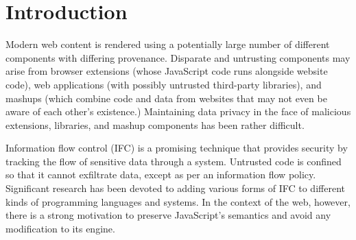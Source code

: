 \section{Introduction}
\label{sec:intro}

Modern web content is rendered using a potentially large number of
different components with differing provenance.
Disparate and untrusting components may arise from browser
extensions (whose JavaScript code runs alongside website
code), web applications (with possibly untrusted third-party
libraries), and mashups (which combine code and data from
websites that may not even be aware of each other's existence.)
Maintaining data privacy in the face of malicious
extensions, libraries, and mashup components has been rather difficult.

Information flow control (IFC) is a promising technique that provides security
by tracking the flow of sensitive data through a system.  Untrusted code is
confined so that it cannot exfiltrate data, except as per an information flow
policy.  Significant research has been devoted to adding various forms of IFC to
different kinds of programming languages and systems.  In the context of the
web, however, there is a strong motivation to preserve JavaScript's semantics
and avoid any modification to its engine.

%

